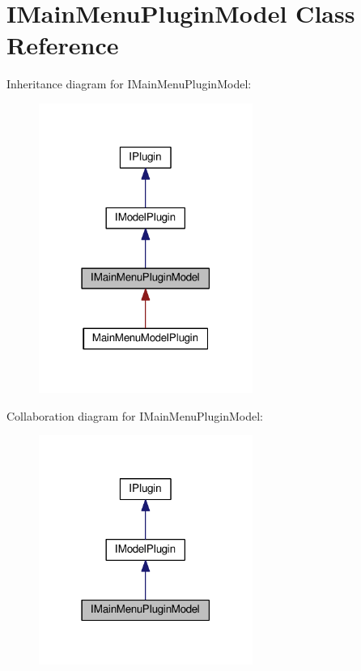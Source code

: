 \hypertarget{class_i_main_menu_plugin_model}{}\section{I\+Main\+Menu\+Plugin\+Model Class Reference}
\label{class_i_main_menu_plugin_model}


Inheritance diagram for I\+Main\+Menu\+Plugin\+Model\+:\nopagebreak
\begin{figure}[H]
\begin{center}
\leavevmode
\includegraphics[width=198pt]{class_i_main_menu_plugin_model__inherit__graph}
\end{center}
\end{figure}


Collaboration diagram for I\+Main\+Menu\+Plugin\+Model\+:\nopagebreak
\begin{figure}[H]
\begin{center}
\leavevmode
\includegraphics[width=198pt]{class_i_main_menu_plugin_model__coll__graph}
\end{center}
\end{figure}
